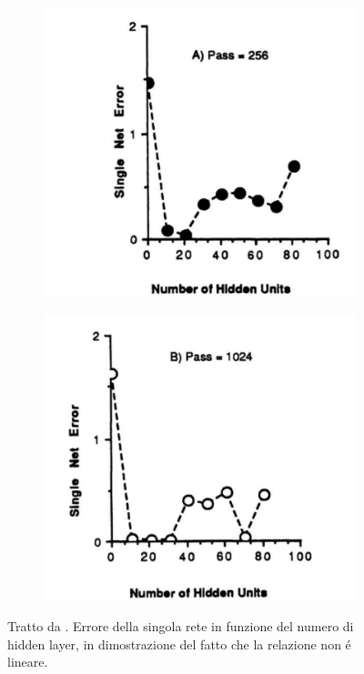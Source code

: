 \documentclass[a4paper,12pt]{report}
\begin{document}
 \begin{figure}[h!]
  \centering
  \begin{subfigure}[b]{0.4\linewidth}
   \includegraphics[width=\linewidth]{NetErrHiddenLa.png}
   \label{NetErrHiddLapgn}
  \end{subfigure}
  \begin{subfigure}[b]{0.4\linewidth}
   \includegraphics[width=\linewidth]{NetErrHiddenLb.png}
   \label{NetErrHiddLbpgn}
  \end{subfigure}
  \caption{Tratto da \cite{lincoln1990synergy}. Errore della singola rete in funzione del numero di hidden layer, in dimostrazione del fatto che la relazione non \'e lineare.}
 \end{figure}
\end{document}
